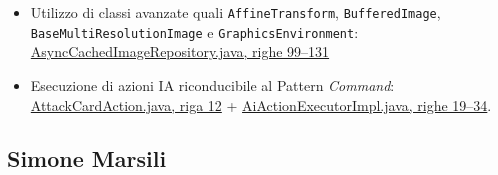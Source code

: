 \begin{itemize}
    {CardComponent.java, righe 166-170}
    \item Utilizzo di classi avanzate quali \texttt{AffineTransform}, \texttt{BufferedImage}, \texttt{BaseMultiResolutionImage} e \texttt{GraphicsEnvironment}: \href{https://github.com/MassimilianoRia/OOP25-MassimilianoRia-SimoneMarsili-FrancescoDama-LorenzoMercuriali-HearthCode/blob/ad762040c1d12b7b424ce558a19d3ee38d20870c/src/main/java/it/unibo/oop/hearthcode/view/utility/AsyncCachedImageRepository.java#L99-L131}
    {AsyncCachedImageRepository.java, righe 99--131}
    \item Esecuzione di azioni IA riconducibile al Pattern \textit{Command}: \href{https://github.com/MassimilianoRia/OOP25-MassimilianoRia-SimoneMarsili-FrancescoDama-LorenzoMercuriali-HearthCode/blob/ad762040c1d12b7b424ce558a19d3ee38d20870c/src/main/java/it/unibo/oop/hearthcode/model/ai/action/impl/AttackCardAction.java#L12}
    {AttackCardAction.java, riga 12} + 
    \href{https://github.com/MassimilianoRia/OOP25-MassimilianoRia-SimoneMarsili-FrancescoDama-LorenzoMercuriali-HearthCode/blob/ad762040c1d12b7b424ce558a19d3ee38d20870c/src/main/java/it/unibo/oop/hearthcode/model/ai/executor/impl/AiActionExecutorImpl.java#L19-L34}
    {AiActionExecutorImpl.java, righe 19--34}.
\end{itemize}

\subsection{Simone Marsili}

